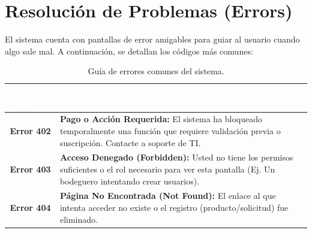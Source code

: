 \documentclass[a4paper, 12pt]{article}
\begin{document}
\section{Resolución de Problemas (Errors)}
El sistema cuenta con pantallas de error amigables para guiar al usuario cuando algo sale mal. A continuación, se detallan los códigos más comunes:

\begin{table}[H]
\centering
\begin{tabularx}{\textwidth}{|c|X|}
\hline
\rowcolor{ucsblue} \textcolor{white}{\textbf{Código de Error}} & \textcolor{white}{\textbf{Descripción y Solución}} \\ \hline
\textbf{Error 402} & \textbf{Pago o Acción Requerida:} El sistema ha bloqueado temporalmente una función que requiere validación previa o suscripción. Contacte a soporte de TI. \\ \hline
\textbf{Error 403} & \textbf{Acceso Denegado (Forbidden):} Usted no tiene los permisos suficientes o el rol necesario para ver esta pantalla (Ej. Un bodeguero intentando crear usuarios). \\ \hline
\textbf{Error 404} & \textbf{Página No Encontrada (Not Found):} El enlace al que intenta acceder no existe o el registro (producto/solicitud) fue eliminado. \\ \hline
\end{tabularx}
\caption{Guía de errores comunes del sistema.}
\end{table}
\end{document}
